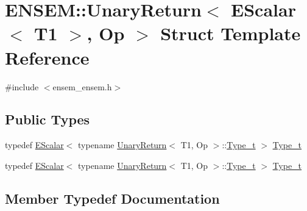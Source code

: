 \hypertarget{structENSEM_1_1UnaryReturn_3_01EScalar_3_01T1_01_4_00_01Op_01_4}{}\section{E\+N\+S\+EM\+:\+:Unary\+Return$<$ E\+Scalar$<$ T1 $>$, Op $>$ Struct Template Reference}
\label{structENSEM_1_1UnaryReturn_3_01EScalar_3_01T1_01_4_00_01Op_01_4}


{\ttfamily \#include $<$ensem\+\_\+ensem.\+h$>$}

\subsection*{Public Types}
\begin{DoxyCompactItemize}
\item 
typedef \mbox{\hyperlink{classENSEM_1_1EScalar}{E\+Scalar}}$<$ typename \mbox{\hyperlink{structENSEM_1_1UnaryReturn}{Unary\+Return}}$<$ T1, Op $>$\+::\mbox{\hyperlink{structENSEM_1_1UnaryReturn_3_01EScalar_3_01T1_01_4_00_01Op_01_4_acb8455aafdd37d1ee54a8dd81669fe24}{Type\+\_\+t}} $>$ \mbox{\hyperlink{structENSEM_1_1UnaryReturn_3_01EScalar_3_01T1_01_4_00_01Op_01_4_acb8455aafdd37d1ee54a8dd81669fe24}{Type\+\_\+t}}
\item 
typedef \mbox{\hyperlink{classENSEM_1_1EScalar}{E\+Scalar}}$<$ typename \mbox{\hyperlink{structENSEM_1_1UnaryReturn}{Unary\+Return}}$<$ T1, Op $>$\+::\mbox{\hyperlink{structENSEM_1_1UnaryReturn_3_01EScalar_3_01T1_01_4_00_01Op_01_4_acb8455aafdd37d1ee54a8dd81669fe24}{Type\+\_\+t}} $>$ \mbox{\hyperlink{structENSEM_1_1UnaryReturn_3_01EScalar_3_01T1_01_4_00_01Op_01_4_acb8455aafdd37d1ee54a8dd81669fe24}{Type\+\_\+t}}
\end{DoxyCompactItemize}


\subsection{Member Typedef Documentation}
\mbox{\label{structENSEM_1_1UnaryReturn_3_01EScalar_3_01T1_01_4_00_01Op_01_4_acb8455aafdd37d1ee54a8dd81669fe24}} 
